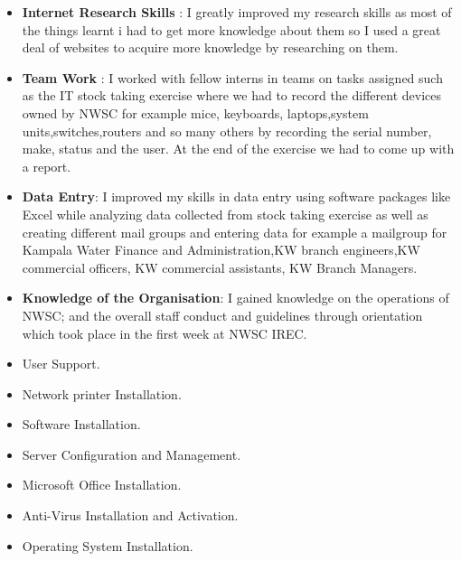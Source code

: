 \documentclass{article}
\begin{document}
\begin{itemize}
\item \textbf{Internet Research Skills} : I greatly improved my research skills as most of the things learnt i had to get more knowledge about them so I used a great deal of websites to acquire more knowledge by researching on them.
\item \textbf{Team Work} : I worked with fellow interns in teams on tasks assigned such as the IT stock taking exercise where we had to record the different devices owned by NWSC for example mice, keyboards, laptops,system units,switches,routers and so many others by recording the serial number, make, status and the user. At the end of the exercise we had to come up with a report. 
\item \textbf{Data Entry}: I improved my skills in data entry using software packages like Excel while analyzing data collected from stock taking exercise as well as creating different mail groups and entering data for example a mailgroup for Kampala Water Finance and Administration,KW branch engineers,KW commercial officers, KW commercial assistants, KW Branch Managers.
\item \textbf{Knowledge of the Organisation}: I gained knowledge on the operations of NWSC; and the overall staff conduct and guidelines through orientation which took place in the first week at NWSC IREC.
\item User Support.
\item Network printer Installation.
\item Software Installation.
\item Server Configuration and Management.
\item Microsoft Office Installation.
\item Anti-Virus Installation and Activation.
\item Operating System Installation.
\end{itemize}
\end{document}
